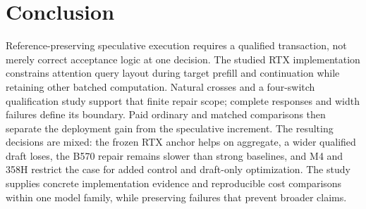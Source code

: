 \section{Conclusion}
Reference-preserving speculative execution requires a qualified transaction, not merely correct acceptance logic at one decision. The studied RTX implementation constrains attention query layout during target prefill and continuation while retaining other batched computation. Natural crosses and a four-switch qualification study support that finite repair scope; complete responses and width failures define its boundary. Paid ordinary and matched comparisons then separate the deployment gain from the speculative increment. The resulting decisions are mixed: the frozen RTX anchor helps on aggregate, a wider qualified draft loses, the B570 repair remains slower than strong baselines, and M4 and 358H restrict the case for added control and draft-only optimization. The study supplies concrete implementation evidence and reproducible cost comparisons within one model family, while preserving failures that prevent broader claims.
